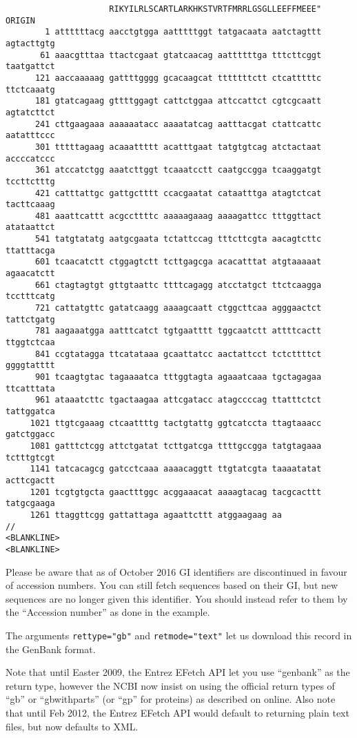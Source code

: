 \begin{verbatim}
                     RIKYILRLSCARTLARKHKSTVRTFMRRLGSGLLEEFFMEEE"
ORIGIN      
        1 attttttacg aacctgtgga aatttttggt tatgacaata aatctagttt agtacttgtg
       61 aaacgtttaa ttactcgaat gtatcaacag aattttttga tttcttcggt taatgattct
      121 aaccaaaaag gattttgggg gcacaagcat tttttttctt ctcatttttc ttctcaaatg
      181 gtatcagaag gttttggagt cattctggaa attccattct cgtcgcaatt agtatcttct
      241 cttgaagaaa aaaaaatacc aaaatatcag aatttacgat ctattcattc aatatttccc
      301 tttttagaag acaaattttt acatttgaat tatgtgtcag atctactaat accccatccc
      361 atccatctgg aaatcttggt tcaaatcctt caatgccgga tcaaggatgt tccttctttg
      421 catttattgc gattgctttt ccacgaatat cataatttga atagtctcat tacttcaaag
      481 aaattcattt acgccttttc aaaaagaaag aaaagattcc tttggttact atataattct
      541 tatgtatatg aatgcgaata tctattccag tttcttcgta aacagtcttc ttatttacga
      601 tcaacatctt ctggagtctt tcttgagcga acacatttat atgtaaaaat agaacatctt
      661 ctagtagtgt gttgtaattc ttttcagagg atcctatgct ttctcaagga tcctttcatg
      721 cattatgttc gatatcaagg aaaagcaatt ctggcttcaa agggaactct tattctgatg
      781 aagaaatgga aatttcatct tgtgaatttt tggcaatctt attttcactt ttggtctcaa
      841 ccgtatagga ttcatataaa gcaattatcc aactattcct tctcttttct ggggtatttt
      901 tcaagtgtac tagaaaatca tttggtagta agaaatcaaa tgctagagaa ttcatttata
      961 ataaatcttc tgactaagaa attcgatacc atagccccag ttatttctct tattggatca
     1021 ttgtcgaaag ctcaattttg tactgtattg ggtcatccta ttagtaaacc gatctggacc
     1081 gatttctcgg attctgatat tcttgatcga ttttgccgga tatgtagaaa tctttgtcgt
     1141 tatcacagcg gatcctcaaa aaaacaggtt ttgtatcgta taaaatatat acttcgactt
     1201 tcgtgtgcta gaactttggc acggaaacat aaaagtacag tacgcacttt tatgcgaaga
     1261 ttaggttcgg gattattaga agaattcttt atggaagaag aa
//
<BLANKLINE>
<BLANKLINE>
\end{verbatim}

Please be aware that as of October 2016 GI identifiers are discontinued in favour of accession numbers. You can still fetch sequences based on their GI, but new sequences are no longer given this identifier. You should instead refer to them by the ``Accession number'' as done in the example.

The arguments \verb+rettype="gb"+ and \verb+retmode="text"+ let us download this record in the GenBank format.

Note that until Easter 2009, the Entrez EFetch API let you use ``genbank'' as the
return type, however the NCBI now insist on using the official return types of
``gb'' or ``gbwithparts'' (or ``gp'' for proteins) as described on online.
Also note that until Feb 2012, the Entrez EFetch API would default to returning
plain text files, but now defaults to XML.

